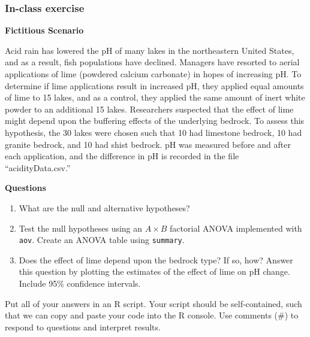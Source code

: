 \documentclass[color=usenames,dvipsnames]{beamer}\usepackage[]{graphicx}\usepackage[]{color}
\begin{document}
\begin{frame}
  \frametitle{In-class exercise}
\scriptsize %

{\bf Fictitious Scenario \par}
Acid rain has lowered the pH of many
lakes in the northeastern United States, and as a result, fish
populations have declined. Managers have resorted to aerial
applications of lime (powdered calcium carbonate) in hopes of
increasing pH. To determine if lime applications result in increased
pH, they applied equal amounts of lime to 15 lakes, and as a control,
they applied the same amount of inert white powder to an additional 15
lakes. Researchers suspected that the effect of lime might depend upon
the buffering effects of the underlying bedrock. To assess this
hypothesis, the 30 lakes were chosen such that 10 had limestone
bedrock, 10 had granite bedrock, and 10 had shist bedrock. pH was
measured before and after each application, and the difference in pH
is recorded in the file ``acidityData.csv.'' \par
\pause
\vfill
{\bf Questions}
\begin{enumerate}[{\bf 1}]
  \item What are the null and alternative hypotheses?
  \item Test the null hypotheses using an $A \times B$ factorial ANOVA
    implemented with {\tt aov}. Create an ANOVA table using {\tt summary}.
  \item Does the effect of lime depend upon the bedrock type? If so,
    how? Answer this question by plotting the estimates of the effect of lime on
    pH change. Include 95\% confidence intervals.
\end{enumerate}
\pause
\vfill
Put all of your answers in an R script. Your script should be
self-contained, such that we can copy and paste your code into the R
console. Use comments (\#) to respond to questions and interpret results.

\end{frame}
\end{document}
